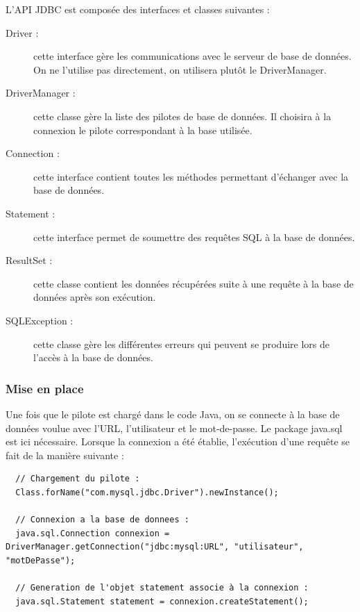 L'API JDBC est composée des interfaces et classes suivantes :
\begin{description}
 \item[Driver :] cette interface gère les communications avec le serveur de base de données. On ne l'utilise pas directement, on utilisera plutôt le DriverManager.
 \item[DriverManager :] cette classe gère la liste des pilotes de base de données. Il choisira à la connexion le pilote correspondant à la base utilisée.
 \item[Connection :] cette interface contient toutes les méthodes permettant d'échanger avec la base de données.
 \item[Statement :] cette interface permet de soumettre des requêtes SQL à la base de données.
 \item[ResultSet :] cette classe contient les données récupérées suite à une requête à la base de données après son exécution.
 \item[SQLException :] cette classe gère les différentes erreurs qui peuvent se produire lors de l'accès à la base de données. 
\end{description}

\subsubsection{Mise en place}

Une fois que le pilote est chargé dans le code Java, on se connecte à la base de données voulue avec l'URL, l'utilisateur et le mot-de-passe. Le package java.sql est ici nécessaire. Lorsque la connexion a été établie, l'exécution d'une requête se fait de la manière suivante :
\begin{lstlisting}
  // Chargement du pilote :
  Class.forName("com.mysql.jdbc.Driver").newInstance();
  
  // Connexion a la base de donnees :
  java.sql.Connection connexion =  DriverManager.getConnection("jdbc:mysql:URL", "utilisateur", "motDePasse");
  
  // Generation de l'objet statement associe à la connexion :
  java.sql.Statement statement = connexion.createStatement();
\end{lstlisting}  
  
